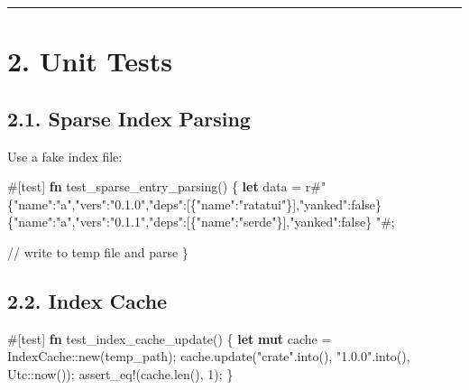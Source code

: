 \documentclass[
  letterpaper,
  DIV=11,
  numbers=noendperiod]{scrreprt}
\newenvironment{Shaded}{\begin{snugshade}}{\end{snugshade}}
\newcommand{\AttributeTok}[1]{\textcolor[rgb]{0.40,0.45,0.13}{#1}}
\newcommand{\CommentTok}[1]{\textcolor[rgb]{0.37,0.37,0.37}{#1}}
\newcommand{\DecValTok}[1]{\textcolor[rgb]{0.68,0.00,0.00}{#1}}
\newcommand{\KeywordTok}[1]{\textcolor[rgb]{0.00,0.23,0.31}{\textbf{#1}}}
\newcommand{\NormalTok}[1]{\textcolor[rgb]{0.00,0.23,0.31}{#1}}
\newcommand{\OperatorTok}[1]{\textcolor[rgb]{0.37,0.37,0.37}{#1}}
\newcommand{\PreprocessorTok}[1]{\textcolor[rgb]{0.68,0.00,0.00}{#1}}
\newcommand{\StringTok}[1]{\textcolor[rgb]{0.13,0.47,0.30}{#1}}
\begin{document}
\begin{center}\rule{0.5\linewidth}{0.5pt}\end{center}

\section{2. Unit Tests}\label{unit-tests}

\subsection{2.1. Sparse Index Parsing}\label{sparse-index-parsing}

Use a fake index file:

\begin{Shaded}
\begin{Highlighting}[]
\AttributeTok{\#[}\NormalTok{test}\AttributeTok{]}
\KeywordTok{fn}\NormalTok{ test\_sparse\_entry\_parsing() }\OperatorTok{\{}
    \KeywordTok{let}\NormalTok{ data }\OperatorTok{=} \StringTok{r\#"}
\StringTok{\{"name":"a","vers":"0.1.0","deps":[\{"name":"ratatui"\}],"yanked":false\}}
\StringTok{\{"name":"a","vers":"0.1.1","deps":[\{"name":"serde"\}],"yanked":false\}}
\StringTok{"\#}\OperatorTok{;}

    \CommentTok{// write to temp file and parse}
\OperatorTok{\}}
\end{Highlighting}
\end{Shaded}

\subsection{2.2. Index Cache}\label{index-cache-1}

\begin{Shaded}
\begin{Highlighting}[]
\AttributeTok{\#[}\NormalTok{test}\AttributeTok{]}
\KeywordTok{fn}\NormalTok{ test\_index\_cache\_update() }\OperatorTok{\{}
    \KeywordTok{let} \KeywordTok{mut}\NormalTok{ cache }\OperatorTok{=} \PreprocessorTok{IndexCache::}\NormalTok{new(temp\_path)}\OperatorTok{;}
\NormalTok{    cache}\OperatorTok{.}\NormalTok{update(}\StringTok{"crate"}\OperatorTok{.}\NormalTok{into()}\OperatorTok{,} \StringTok{"1.0.0"}\OperatorTok{.}\NormalTok{into()}\OperatorTok{,} \PreprocessorTok{Utc::}\NormalTok{now())}\OperatorTok{;}
    \PreprocessorTok{assert\_eq!}\NormalTok{(cache}\OperatorTok{.}\NormalTok{len()}\OperatorTok{,} \DecValTok{1}\NormalTok{)}\OperatorTok{;}
\OperatorTok{\}}
\end{Highlighting}
\end{Shaded}
\end{document}
